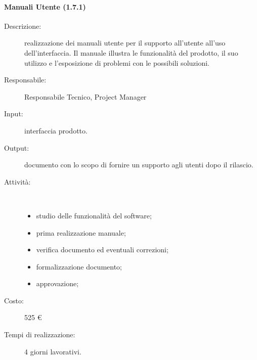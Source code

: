 \paragraph{Manuali Utente (1.7.1)}
\begin{description}
\item[Descrizione:] realizzazione dei manuali utente per il supporto all'utente all'uso dell'interfaccia. Il manuale illustra le funzionalit\`{a} del prodotto, il suo utilizzo e l'esposizione di problemi con le possibili soluzioni.
\item[Responsabile:] Responsabile Tecnico, Project Manager
\item[Input:] interfaccia prodotto.
\item[Output:] documento con lo scopo di fornire un supporto agli utenti dopo il rilascio.
\item[Attività:]\mbox{}\\[-1.5\baselineskip]
	\begin{itemize}
	\item studio delle funzionalit\`{a} del software;
	\item prima realizzazione manuale;
	\item verifica documento ed eventuali correzioni;
	\item formalizzazione documento;
	\item approvazione;
	\end{itemize}
\item[Costo:] 525 \euro{}
\item[Tempi di realizzazione:] 4 giorni lavorativi.
\end{description}

